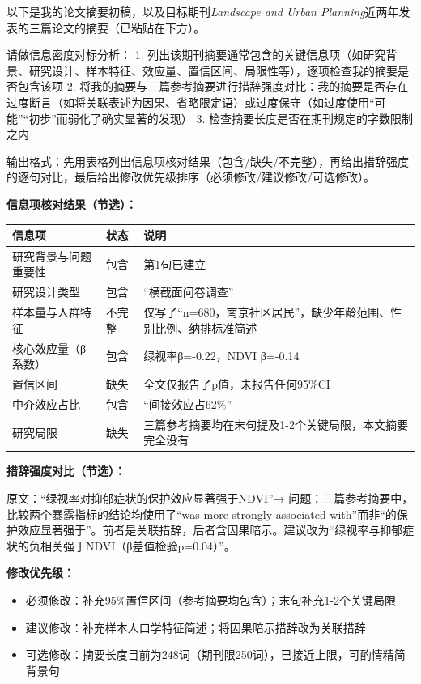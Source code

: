 \begin{userbox}
以下是我的论文摘要初稿，以及目标期刊\textit{Landscape and Urban Planning}近两年发表的三篇论文的摘要（已粘贴在下方）。

请做信息密度对标分析：
1. 列出该期刊摘要通常包含的关键信息项（如研究背景、研究设计、样本特征、效应量、置信区间、局限性等），逐项检查我的摘要是否包含该项
2. 将我的摘要与三篇参考摘要进行措辞强度对比：我的摘要是否存在过度断言（如将关联表述为因果、省略限定语）或过度保守（如过度使用``可能''``初步''而弱化了确实显著的发现）
3. 检查摘要长度是否在期刊规定的字数限制之内

输出格式：先用表格列出信息项核对结果（包含/缺失/不完整），再给出措辞强度的逐句对比，最后给出修改优先级排序（必须修改/建议修改/可选修改）。
\end{userbox}

\begin{aibox}
\textbf{信息项核对结果（节选）：}

\begin{formalTable}[H]
\begin{tabular}{p{4.5cm} p{3.0cm} p{5.0cm}}
\toprule
\textbf{信息项} & \textbf{状态} & \textbf{说明} \\
\midrule
研究背景与问题重要性 & 包含 & 第1句已建立 \\
研究设计类型 & 包含 & ``横截面问卷调查'' \\
样本量与人群特征 & 不完整 & 仅写了``n=680，南京社区居民''，缺少年龄范围、性别比例、纳排标准简述 \\
核心效应量（β系数） & 包含 & 绿视率β=-0.22，NDVI β=-0.14 \\
置信区间 & 缺失 & 全文仅报告了p值，未报告任何95\%CI \\
中介效应占比 & 包含 & ``间接效应占62\%'' \\
研究局限 & 缺失 & 三篇参考摘要均在末句提及1-2个关键局限，本文摘要完全没有 \\
\bottomrule
\end{tabular}
\end{formalTable}

\smallskip
\textbf{措辞强度对比（节选）：}

原文：``绿视率对抑郁症状的保护效应显著强于NDVI''→ 问题：三篇参考摘要中，比较两个暴露指标的结论均使用了``was more strongly associated with''而非``的保护效应显著强于''。前者是关联措辞，后者含因果暗示。建议改为``绿视率与抑郁症状的负相关强于NDVI（β差值检验p=0.04）''。

\textbf{修改优先级：}
\begin{itemize}[nosep]
\item 必须修改：补充95\%置信区间（参考摘要均包含）；末句补充1-2个关键局限
\item 建议修改：补充样本人口学特征简述；将因果暗示措辞改为关联措辞
\item 可选修改：摘要长度目前为248词（期刊限250词），已接近上限，可酌情精简背景句
\end{itemize}
\end{aibox}

